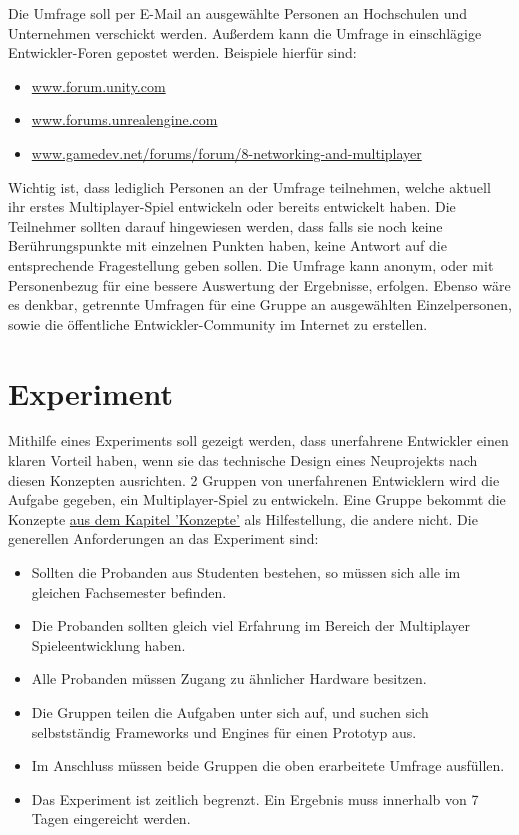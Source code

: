 Die Umfrage soll per E-Mail an ausgewählte Personen an Hochschulen und Unternehmen verschickt werden. Außerdem kann die Umfrage in einschlägige Entwickler-Foren gepostet werden. Beispiele hierfür sind:
\begin{itemize}
	\item \href{www.forum.unity.com}{www.forum.unity.com}
	\item \href{www.forums.unrealengine.com}{www.forums.unrealengine.com}
	\item \href{www.gamedev.net/forums/forum/8-networking-and-multiplayer}{www.gamedev.net/forums/forum/8-networking-and-multiplayer}
\end{itemize}

Wichtig ist, dass lediglich Personen an der Umfrage teilnehmen, welche aktuell ihr erstes Multiplayer-Spiel entwickeln oder bereits entwickelt haben. Die Teilnehmer sollten darauf hingewiesen werden, dass falls sie noch keine Berührungspunkte mit einzelnen Punkten haben, keine Antwort auf die entsprechende Fragestellung geben sollen. Die Umfrage kann anonym, oder mit Personenbezug für eine bessere Auswertung der Ergebnisse, erfolgen. Ebenso wäre es denkbar, getrennte Umfragen für eine Gruppe an ausgewählten Einzelpersonen, sowie die öffentliche Entwickler-Community im Internet zu erstellen.

\section{Experiment}

Mithilfe eines Experiments soll gezeigt werden, dass unerfahrene Entwickler einen klaren Vorteil haben, wenn sie das technische Design eines Neuprojekts nach diesen Konzepten ausrichten. 2 Gruppen von unerfahrenen Entwicklern wird die Aufgabe gegeben, ein Multiplayer-Spiel zu entwickeln. Eine Gruppe bekommt die Konzepte \hyperref[sec:konzepte]{aus dem Kapitel 'Konzepte'} als Hilfestellung, die andere nicht. Die generellen Anforderungen an das Experiment sind:

\begin{itemize}
	\item Sollten die Probanden aus Studenten bestehen, so müssen sich alle im gleichen Fachsemester befinden.
	\item Die Probanden sollten gleich viel Erfahrung im Bereich der Multiplayer Spieleentwicklung haben.
	\item Alle Probanden müssen Zugang zu ähnlicher Hardware besitzen.
	\item Die Gruppen teilen die Aufgaben unter sich auf, und suchen sich selbstständig Frameworks und Engines für einen Prototyp aus.
	\item Im Anschluss müssen beide Gruppen die oben erarbeitete Umfrage ausfüllen.
	\item Das Experiment ist zeitlich begrenzt. Ein Ergebnis muss innerhalb von 7 Tagen eingereicht werden. 
\end{itemize}


